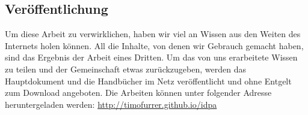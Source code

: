 \subsection{Veröffentlichung}
Um diese Arbeit zu verwirklichen, haben wir viel an Wissen aus den Weiten des Internets holen können. All die Inhalte, von denen wir Gebrauch gemacht haben, sind das Ergebnis der Arbeit eines Dritten. Um das von uns erarbeitete Wissen zu teilen und der Gemeinschaft etwas zurückzugeben, werden das Hauptdokument und die Handbücher im Netz veröffentlicht und ohne Entgelt zum Download angeboten.
Die Arbeiten können unter folgender Adresse heruntergeladen werden: \url{http://timofurrer.github.io/idpa}
